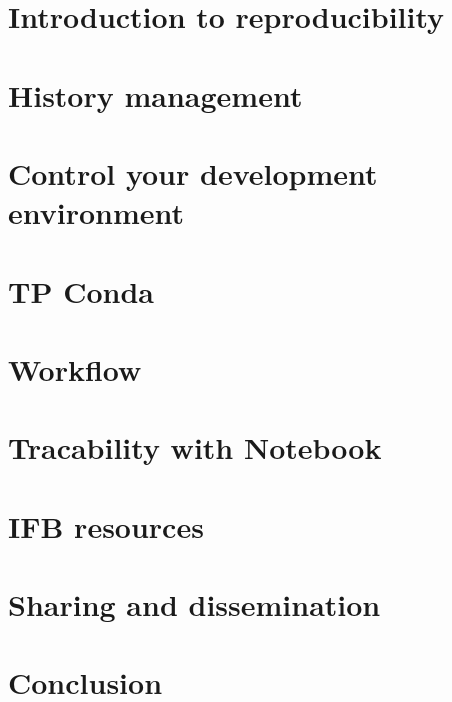 \documentclass{beamer}
\begin{document}
\section[Introduction]{Introduction to reproducibility}

\label{History}
\section[History]{History management}

\label{Encapsulation}
\section[Encapsulation]{Control your development environment}

\label{Software_Environment}
\section[Environment]{TP Conda}

\label{Workflow}
\section[Pipeline]{Workflow}

\label{Notebooks}
\section{Tracability with Notebook}

\label{IFB}
\section[IFB]{IFB resources}

\label{Sharing}
\section{Sharing and dissemination}

\label{Conclusion}
\section{Conclusion}

\end{document}
